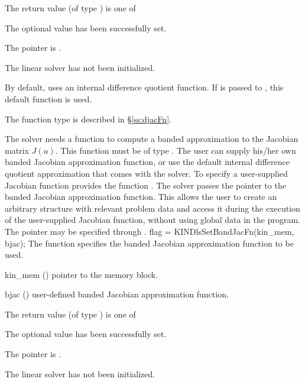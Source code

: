 {
  The return value  (of type ) is one of
  \begin{args}
  \item[\Id{KINDLS\_SUCCESS}] 
    The optional value has been successfully set.
  \item[\Id{KINDLS\_MEM\_NULL}]
    The  pointer is .
  \item[\Id{KINDLS\_LMEM\_NULL}]
    The {\kindense} linear solver has not been initialized.
  \end{args}
}
{
  By default, {\kindense} uses an internal difference quotient function.
  If  is passed to , this default function is used.

  The function type  is described in \S\ref{ss:djacFn}.
}
The 
{\kindense} solver needs a function to compute a banded approximation to
the Jacobian matrix $J(u)$.  This function must be of type . 
The user can supply his/her own banded Jacobian approximation function, 
or use the default internal difference quotient approximation
that comes with the {\kinband} solver.
To specify a user-supplied Jacobian function  {\kinband} provides 
the function .
The {\kinband} solver passes the pointer 
to the banded Jacobian approximation function. This allows the user to
create an arbitrary structure with relevant problem data and access it
during the execution of the user-supplied Jacobian function, without
using global data in the program.  The pointer  may be
specified through .
{
  flag = KINDlsSetBandJacFn(kin\_mem, bjac);
}
{
  The function  specifies the banded Jacobian
  approximation function to be used.
}
{
  \begin{args}
  \item[kin\_mem] ()
    pointer to the {\kinsol} memory block.
  \item[bjac] ()
    user-defined banded Jacobian approximation function.
  \end{args}
}
{
  The return value  (of type ) is one of
  \begin{args}
  \item[\Id{KINDLS\_SUCCESS}] 
    The optional value has been successfully set.
  \item[\Id{KINDLS\_MEM\_NULL}]
    The  pointer is .
  \item[\Id{KINDLS\_LMEM\_NULL}]
    The {\kinband} linear solver has not been initialized.
  \end{args}
}
